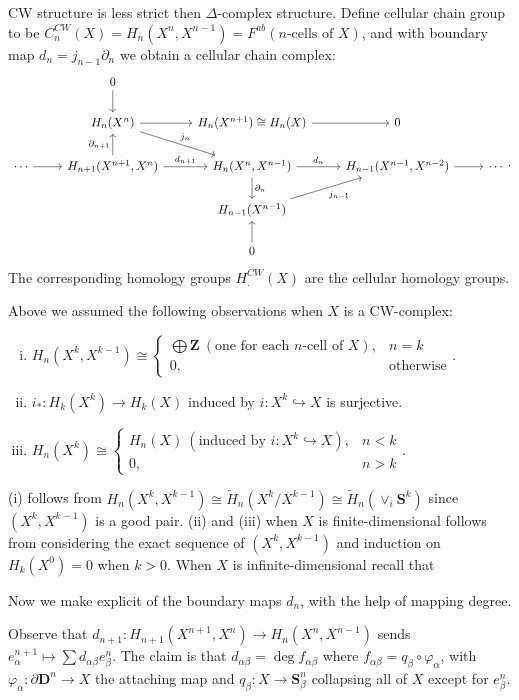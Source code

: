 \documentclass[11pt]{article}
\theoremstyle{definition}
\theoremstyle{plain}
\newcommand{\Z}{\mathbf{Z}}
\begin{document}
CW structure is less strict then $\Delta$-complex structure. Define cellular chain group to be $C_n^{CW}(X)=H_n(X^n,X^{n-1})=F^{ab}(n\textrm{-cells of }X)$, and with boundary map $d_n=j_{n-1}\partial_n$ we obtain a cellular chain complex:
\[\begin{tikzcd}[column sep=small]
&&0\arrow[d]&&&&&&\\
&&H_n(X^n)\arrow[rrd, "j_n"]\arrow[rr]&&H_n(X^{n+1})\cong H_n(X)\arrow[rr]&&0&&\\
\cdots\arrow[rr]&&{H_{n+1}(X^{n+1},X^n)}\arrow[u,"\partial_{n+1}"]\arrow[rr,"d_{n+1}"]&& {H_n(X^n,X^{n-1})}\arrow[rr, "d_n"] \arrow[d, "\partial_n"] &  & {H_{n-1}(X^{n-1},X^{n-2})} \arrow[rr]&&\cdots\\
&&&&H_{n-1}(X^{n-1})\arrow[rru,"j_{n-1}"']&&&&\\
&&&&0\arrow[u]&&&&       
\end{tikzcd}.\]
The corresponding homology groups $H_.^{CW}(X)$ are the cellular homology groups.\medbreak

Above we assumed the following observations when $X$ is a CW-complex:
\begin{enumerate}[(i)]
\item $H_n(X^k,X^{k-1})\cong\begin{cases}\bigoplus\Z\ (\textrm{one for each }n\textrm{-cell of }X),&n=k\\0,&\textrm{otherwise}
\end{cases}$.

\item $i_\ast:H_k(X^k)\to H_k(X)$ induced by $i:X^k\hookrightarrow X$ is surjective.

\item $H_n(X^k)\cong\begin{cases}H_n(X)\ (\textrm{induced by }i:X^k\hookrightarrow X),&n<k\\0,&n>k
\end{cases}$.
\end{enumerate}
(i) follows from $H_n(X^k,X^{k-1})\cong\widetilde{H}_n(X^k/X^{k-1})\cong\widetilde{H}_n(\vee_i\mathbf{S}^k)$ since $(X^k,X^{k-1})$ is a good pair. (ii) and (iii) when $X$ is finite-dimensional follows from considering the exact sequence of $(X^k,X^{k-1})$ and induction on $H_k(X^0)=0$ when $k>0$. When $X$ is infinite-dimensional recall that\medbreak

Now we make explicit of the boundary maps $d_n$, with the help of mapping degree.\medbreak

Observe that $d_{n+1}:H_{n+1}(X^{n+1},X^n)\to H_n(X^n,X^{n-1})$ sends $e_\alpha^{n+1}\mapsto\sum d_{\alpha\beta}e^n_\beta$. The claim is that $d_{\alpha\beta}=\deg f_{\alpha\beta}$ where $f_{\alpha\beta}=q_\beta\circ\varphi_\alpha$, with $\varphi_\alpha:\partial\mathbf{D}^n\to X$ the attaching map and $q_\beta:X\to\mathbf{S}^n_\beta$ collapsing all of $X$ except for $e_\beta^n$.
\end{document}
